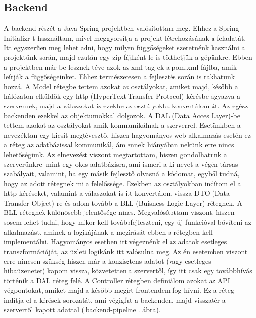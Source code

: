 \documentclass[a4paper,twoside]{article}
\begin{document}
\subsection{Backend}
A backend részét a Java Spring projektben valósítottam meg. Ehhez a Spring Initializr-t használtam, mivel meggyorsítja a projekt létrehozásának a feladatát. Itt
egyszerűen meg lehet adni, hogy milyen függőségeket szeretnénk használni a projektünk során, majd ezután egy zip fájlként le is tölthetjük a gépünkre. Ebben a projektben már be lesznek téve azok az xml tag-ek a pom.xml fájlba, amik leírják a függőségeinket. Ehhez természetesen a fejlesztés során is rakhatunk hozzá. 
A Model rétegbe tettem azokat az osztályokat, amiket majd, később a hálózaton elküldök egy
http (HyperText Transfer Protocol) kérésbe ágyazva a szervernek, majd a válaszokat is ezekbe
az osztályokba konvertálom át. Az egész backenden ezekkel az objektumokkal dolgozok.
A DAL (Data Acces Layer)-be tettem azokat az osztályokat amik kommunikálnak a
szerverrel. Esetünkben a nevezéktan egy kicsit megtévesztő, hiszen hagyományos web
alkalmazás esetén ez a réteg az adatbázissal kommunikál, ám ennek hiányában nekünk erre
nincs lehetőségünk. Az elnevezést viszont megtartottam, hiszen gondolhatunk a szerverünkre,
mint egy okos adatbázisra, ami ismeri a ki nevet a végén társas szabályait, valamint, ha egy
másik fejlesztő olvasná a kódomat, egyből tudná, hogy az adott rétegnek mi a felelőssége.
Ezekben az osztályokban indítom el a http kéréseket, valamint a válaszokat is itt konvertálom
vissza DTO (Data Transfer Object)-re és adom tovább a BLL (Buisness Logic Layer)
rétegnek.
A BLL rétegnek különösebb jelentősége nincs. Megvalósítottam viszont, hiszen sosem lehet
tudni, hogy mikor kell továbbfejleszteni, egy új funkcióval bővíteni az alkalmazást, aminek a
logikájának a megírását ebben a rétegben kell implementálni. Hagyományos esetben itt
végeznénk el az adatok esetleges transzformációját, az üzleti logikánk itt valósulna meg. Az
én esetemben viszont erre nincsen szükség hiszen már a konzisztens adatot (vagy esetleges
hibaüzenetet) kapom vissza, közvetetten a szervertől, így itt csak egy továbbhívás történik a
DAL réteg felé.
A Controller rétegben definiálom azokat az API végpontokat, amiket majd a később megírt
frontendem fog hívni. Ez a réteg indítja el a kérések sorozatát, ami végigfut a backenden,
majd visszatér a szervertől kapott adattal (\ref{backend-pipeline}. ábra).
\end{document}
